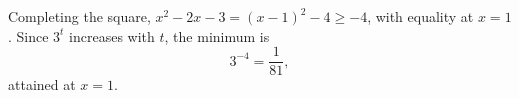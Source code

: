 Completing the square, $x^2-2x-3=(x-1)^2-4\ge-4$, with equality at $x=1$. Since $3^t$ increases with $t$, the minimum is
\[3^{-4}=\boxed{\dfrac1{81}},\]
attained at $x=1$.
